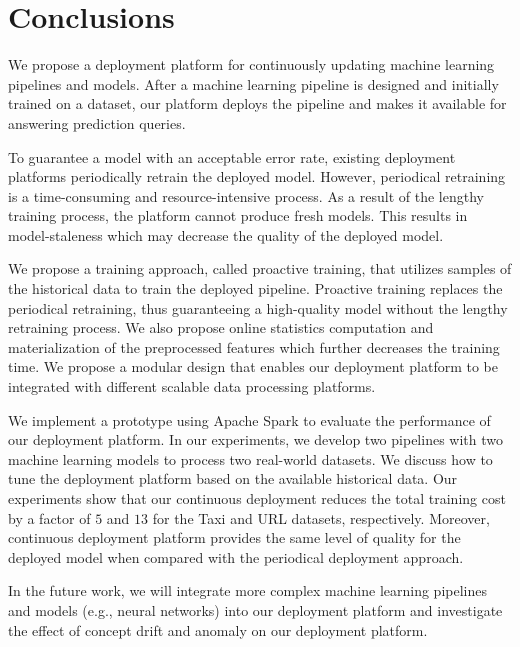 \section{Conclusions} \label{conclusion}
We propose a deployment platform for continuously updating machine learning pipelines and models.
After a machine learning pipeline is designed and initially trained on a dataset, our platform deploys the pipeline and makes it available for answering prediction queries.

To guarantee a model with an acceptable error rate, existing deployment platforms periodically retrain the deployed model. 
However, periodical retraining is a time-consuming and resource-intensive process.
As a result of the lengthy training process, the platform cannot produce fresh models.
This results in model-staleness which may decrease the quality of the deployed model.

We propose a training approach, called proactive training, that utilizes samples of the historical data to train the deployed pipeline.
Proactive training replaces the periodical retraining, thus guaranteeing a high-quality model without the lengthy retraining process.
We also propose online statistics computation and materialization of the preprocessed features which further decreases the training time.
We propose a modular design that enables our deployment platform to be integrated with different scalable data processing platforms.

We implement a prototype using Apache Spark to evaluate the performance of our deployment platform.
In our experiments, we develop two pipelines with two machine learning models to process two real-world datasets.
We discuss how to tune the deployment platform based on the available historical data.
Our experiments show that our continuous deployment reduces the total training cost by a factor of $5$ and $13$ for the Taxi and URL datasets, respectively.
Moreover, continuous deployment platform provides the same level of quality for the deployed model when compared with the periodical deployment approach.

In the future work, we will integrate more complex machine learning pipelines and models (e.g., neural networks) into our deployment platform and investigate the effect of concept drift and anomaly on our deployment platform.

